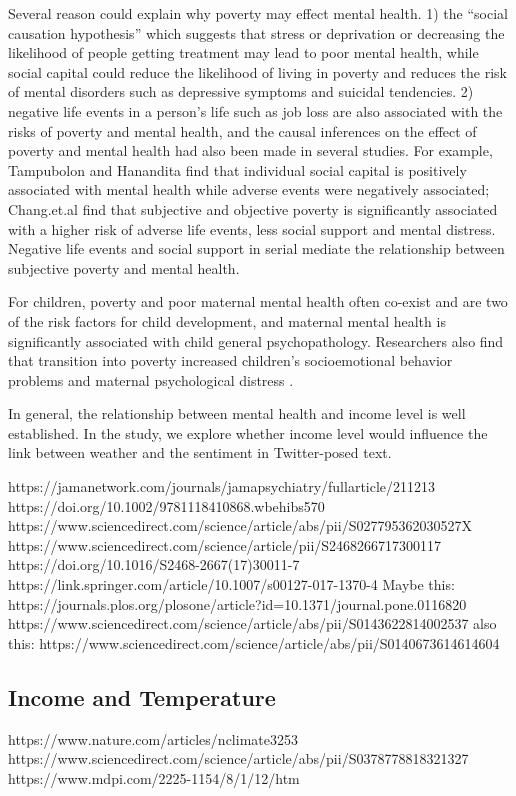 \documentclass{article}
\begin{document}
 
 Several reason could explain why poverty may effect mental health. 1) the “social causation hypothesis” which suggests that stress or deprivation or decreasing the likelihood of people getting treatment may lead to poor mental health\citep{mills2015}, while social capital could reduce the likelihood of living in poverty and reduces the risk of mental disorders such as depressive symptoms and suicidal tendencies\citep{RN1291}. 2) negative life events in a person’s life such as job loss are also associated with the risks of poverty\citep{RN1293} and mental health\citep{TAMPUBOLON201420}, and the causal inferences on the effect of poverty and mental health had also been made in several studies. For example, Tampubolon and Hanandita\citep{TAMPUBOLON201420} find that individual social capital is positively associated with mental health while adverse events were negatively associated; Chang.et.al \citep{RN1291} find that subjective and objective poverty is significantly associated with a higher risk of adverse life events, less social support and mental distress. Negative life events and social support in serial mediate the relationship between subjective poverty and mental health.

For children, poverty and poor maternal mental health often co-exist and are two of the risk factors for child development\citep{LUND20111502}, and maternal mental health is significantly associated with child general psychopathology\citep{ RN1289}. Researchers also find that transition into poverty increased children’s socioemotional behavior problems and maternal psychological distress \citep{WICKHAM2017e141}.

In general, the relationship between mental health and income level is well established. In the study, we explore whether income level would influence the link between weather and the sentiment in Twitter-posed text.

https://jamanetwork.com/journals/jamapsychiatry/fullarticle/211213
https://doi.org/10.1002/9781118410868.wbehibs570
https://www.sciencedirect.com/science/article/abs/pii/S027795362030527X
https://www.sciencedirect.com/science/article/pii/S2468266717300117
https://doi.org/10.1016/S2468-2667(17)30011-7
https://link.springer.com/article/10.1007/s00127-017-1370-4
Maybe this: https://journals.plos.org/plosone/article?id=10.1371/journal.pone.0116820
https://www.sciencedirect.com/science/article/abs/pii/S0143622814002537
also this: https://www.sciencedirect.com/science/article/abs/pii/S0140673614614604

\subsection{Income and Temperature}
https://www.nature.com/articles/nclimate3253
https://www.sciencedirect.com/science/article/abs/pii/S0378778818321327
https://www.mdpi.com/2225-1154/8/1/12/htm
\end{document}
